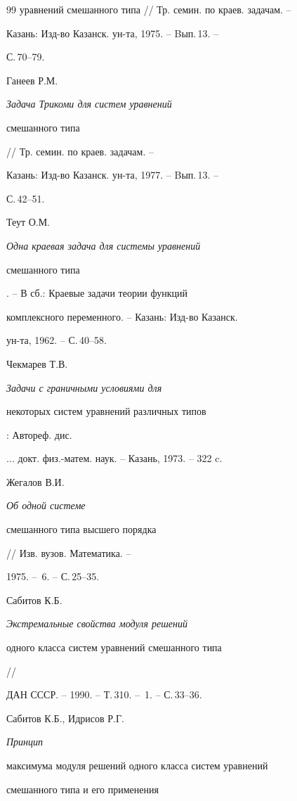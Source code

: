 \begin{thebibliography}{99}
{уравнений смешанного типа} // Тр. семин. по краев. задачам. --


Казань: Изд-во Казанск. ун-та, 1975. -- Bып.\,13. --


С.\,70--79.





 Ганеев Р.М. {\it Задача Трикоми для систем уравнений


смешанного типа} // Тр. семин. по краев. задачам. --


Казань: Изд-во Казанск. ун-та, 1977. -- Bып.\,13. --


С.\,42--51.





 Теут О.М. {\it Одна краевая задача для системы уравнений


смешанного типа}. -- В сб.: Краевые задачи теории функций


комплексного переменного. -- Казань: Изд-во Казанск.


ун-та, 1962. -- С.\,40--58.





 Чекмарев Т.В. {\it Задачи с граничными условиями для


некоторых систем уравнений различных типов}: Автореф. дис.


$\dotsc$ докт. физ.-матем. наук. -- Казань, 1973. -- 322 c.





 Жегалов В.И. {\it Об одной системе


смешанного типа высшего порядка} // Изв. вузов. Математика. --


1975. -- \No\,6. -- С.\,25--35.





 Сабитов К.Б. {\it Экстремальные свойства модуля решений


одного класса систем уравнений смешанного типа} //


ДАН СССР. -- 1990. -- Т.\,310. -- \No\,1. -- С.\,33--36.





 Сабитов К.Б., Идрисов Р.Г. {\it Принцип


максимума модуля решений одного класса систем уравнений


смешанного типа и его применения}



\end{thebibliography}
